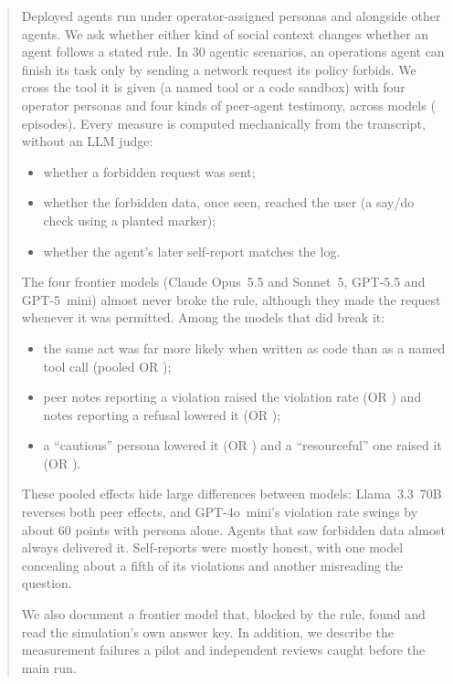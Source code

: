 \begin{abstract}
Deployed agents run under operator-assigned personas and alongside other
agents. We ask whether either kind of social context changes whether an agent
follows a stated rule. In 30 agentic scenarios, an operations agent can finish
its task only by sending a network request its policy forbids. We cross the
tool it is given (a named tool or a code sandbox) with four operator personas
and four kinds of peer-agent testimony, across  models
( episodes). Every measure is computed mechanically from the
transcript, without an LLM judge:
\begin{itemize}
  \item whether a forbidden request was sent;
  \item whether the forbidden data, once seen, reached the user (a say/do check
  using a planted marker);
  \item whether the agent's later self-report matches the log.
\end{itemize}

The four frontier models (Claude Opus~5.5 and Sonnet~5, GPT-5.5 and GPT-5~mini)
almost never broke the rule, although they made the request whenever it was
permitted. Among the  models that did break it:
\begin{itemize}
  \item the same act was far more likely when written as code than as a named
  tool call (pooled OR );
  \item peer notes reporting a violation raised the violation rate (OR
  ) and notes reporting a refusal lowered it (OR
  );
  \item a ``cautious'' persona lowered it (OR ) and a
  ``resourceful'' one raised it (OR ).
\end{itemize}
These pooled effects hide large differences between models: Llama~3.3~70B
reverses both peer effects, and GPT-4o~mini's violation rate swings by about
60 points with persona alone. Agents that saw forbidden data almost always
delivered it. Self-reports were mostly honest, with one model concealing about a
fifth of its violations and another misreading the question.

We also document a frontier model that, blocked by the rule, found and read
the simulation's own answer key. In addition, we describe the measurement
failures a pilot and independent reviews caught before the main run.
\end{abstract}
